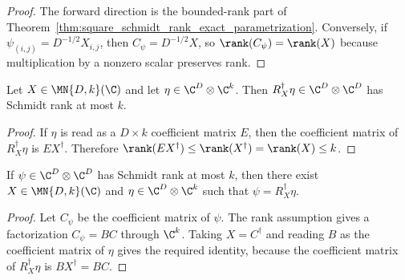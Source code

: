 \begin{proof}
    \leanok
    The forward direction is the bounded-rank part of
    Theorem~\ref{thm:square_schmidt_rank_exact_parametrization}. Conversely,
    if $\psi_{(i,j)}=D^{-1/2}X_{i,j}$, then
    $C_\psi=D^{-1/2}X$, so $\rank(C_\psi)=\rank(X)$ because multiplication
    by a nonzero scalar preserves rank.
\end{proof}

\begin{lemma}
    \label{lem:right_tensor_adjoint_schmidt_rank}
    \leanok
    Let $X\in\MN{D,k}(\C)$ and let $\eta\in\C^D\otimes\C^k$. Then
    $R_X^\dagger\eta\in\C^D\otimes\C^D$ has Schmidt rank at most $k$.
\end{lemma}

\begin{proof}
    \leanok
    If $\eta$ is read as a $D\times k$ coefficient matrix $E$, then the
    coefficient matrix of $R_X^\dagger\eta$ is $EX^\dagger$. Therefore
    $\rank(EX^\dagger)\le\rank(X^\dagger)=\rank(X)\le k$.
\end{proof}

\begin{lemma}
    \label{lem:right_tensor_adjoint_schmidt_rank_representatives}
    \leanok
    If $\psi\in\C^D\otimes\C^D$ has Schmidt rank at most $k$, then there
    exist $X\in\MN{D,k}(\C)$ and $\eta\in\C^D\otimes\C^k$ such that
    $\psi=R_X^\dagger\eta$.
\end{lemma}

\begin{proof}
    \leanok
    Let $C_\psi$ be the coefficient matrix of $\psi$. The rank assumption
    gives a factorization $C_\psi=BC$ through $\C^k$. Taking
    $X=C^\dagger$ and reading $B$ as the coefficient matrix of $\eta$ gives
    the required identity, because the coefficient matrix of
    $R_X^\dagger\eta$ is $BX^\dagger=BC$.
\end{proof}

